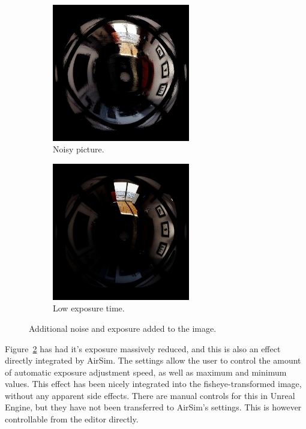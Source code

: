 \begin{figure}[!htb]
    \centering
    \begin{subfigure}{0.45\textwidth}
        \centering
        \includegraphics[height=6cm]{rapport/fig/Results/pp/noise_normal_exposure.jpeg}
        \caption{Noisy picture.}
        \label{fig:res_pp_noise_yes}
    \end{subfigure}
    \begin{subfigure}{0.45\textwidth}
        \centering
        \includegraphics[height=6cm]{rapport/fig/Results/pp/no_nooise_high_min_brightness.jpeg}
        \caption{Low exposure time.}
        \label{fig:res_pp_exposure_yes}
    \end{subfigure}
    \caption{Additional noise and exposure added to the image.}
    \label{fig:res_pp}
\end{figure}

Figure~\ref{fig:res_pp_exposure_yes} has had it's exposure massively reduced, and this is also an effect directly integrated by AirSim. The settings allow the user to control the amount of automatic exposure adjustment speed, as well as maximum and minimum values. This effect has been nicely integrated into the fisheye-transformed image, without any apparent side effects. There are manual controls for this in Unreal Engine, but they have not been transferred to AirSim's settings. This is however controllable from the editor directly.

